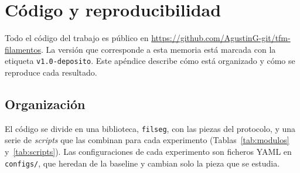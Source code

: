 
\chapter{Código y reproducibilidad}
\label{ap:codigo}

Todo el código del trabajo es público en
\url{https://github.com/AgustinG-git/tfm-filamentos}. La versión que
corresponde a esta memoria está marcada con la etiqueta
\texttt{v1.0-deposito}. Este apéndice describe cómo está organizado y
cómo se reproduce cada resultado.

\section{Organización}

El código se divide en una biblioteca, \texttt{filseg}, con las piezas
del protocolo, y una serie de \emph{scripts} que las combinan para cada
experimento (Tablas~\ref{tab:modulos} y~\ref{tab:scripts}). Las
configuraciones de cada experimento son ficheros YAML en
\texttt{configs/}, que heredan de la baseline y cambian solo la pieza que
se estudia.


